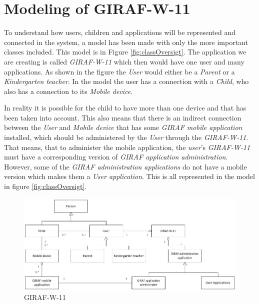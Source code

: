 \section{Modeling of GIRAF-W-11}
To understand how users, children and applications will be represented and connected in the system, a model  has been made with only the more important classes included. This model is in Figure \vref{fig:classOversigt}. The application we are creating is called \emph{GIRAF-W-11} which then would have one user and many applications. As shown in the figure the \emph{User} would either be a \emph{Parent} or a \emph{Kindergarten teacher}. In the model the user has a connection with a \emph{Child}, who also has a connection to its \emph{Mobile device}.

In reality it is possible for the child to have more than one device and that has been taken into account. This also means that there is an indirect connection between the \emph{User} and \emph{Mobile device} that has some \emph{GIRAF mobile application} installed, which should be administered by the \emph{User} through the \emph{GIRAF-W-11}. That means, that to administer the mobile application, the \emph{user}'s \emph{GIRAF-W-11} must have a corresponding version of \emph{GIRAF application administration}. However, some of the \emph{GIRAF administration applications} do not have a mobile version which makes them a \emph{User application}. This is all represented in the model in figure \vref{fig:classOversigt}.


\begin{figure}[!ht]
	\centering
		\includegraphics[width=1.00\textwidth]{img/classOversigt.jpg}
	\caption{GIRAF-W-11}
	\label{fig:classOversigt}
\end{figure}
\newpage